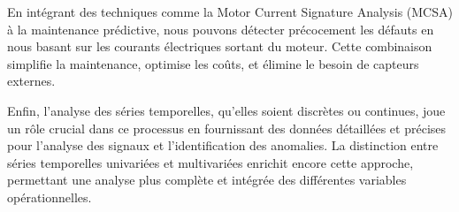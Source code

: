 En intégrant des techniques comme la Motor Current Signature Analysis (MCSA) à
la maintenance prédictive, nous pouvons détecter précocement les défauts en
nous basant sur les courants électriques sortant du moteur. Cette combinaison
simplifie la maintenance, optimise les coûts, et élimine le besoin de capteurs
externes.

Enfin, l'analyse des séries temporelles, qu'elles soient discrètes ou
continues, joue un rôle crucial dans ce processus en fournissant des données
détaillées et précises pour l'analyse des signaux et l'identification des
anomalies. La distinction entre séries temporelles univariées et multivariées
enrichit encore cette approche, permettant une analyse plus complète et
intégrée des différentes variables opérationnelles.

